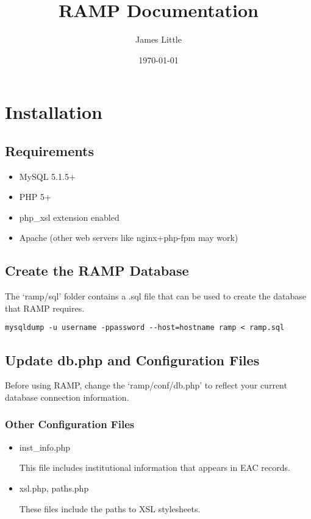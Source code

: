 \documentclass[11pt]{article}
\title{RAMP Documentation}
\author{James Little}
\date{\today}
\begin{document}
\maketitle

\setcounter{tocdepth}{3}
\tableofcontents
\vspace*{1cm}
\section{Installation}
\label{sec-1}
\subsection{Requirements}
\label{sec-1-1}

\begin{itemize}
\item MySQL 5.1.5+
\item PHP 5+
\item php\_{}xsl extension enabled
\item Apache (other web servers like nginx+php-fpm may work)
\end{itemize}
  
\subsection{Create the RAMP Database}
\label{sec-1-2}

   
   The `ramp/sql' folder contains a .sql file that can be used to create the database that RAMP requires. 
   

\begin{verbatim}
mysqldump -u username -ppassword --host=hostname ramp < ramp.sql
\end{verbatim}
   
\subsection{Update db.php and Configuration Files}
\label{sec-1-3}

   
   Before using RAMP, change the `ramp/conf/db.php' to reflect your current database connection information. 
\subsubsection{Other Configuration Files}
\label{sec-1-3-1}

\begin{itemize}
\item inst\_{}info.php

  This file includes institutional information that appears in EAC records.
\item xsl.php, paths.php

  These files include the paths to XSL stylesheets.
\end{itemize}
\end{document}
